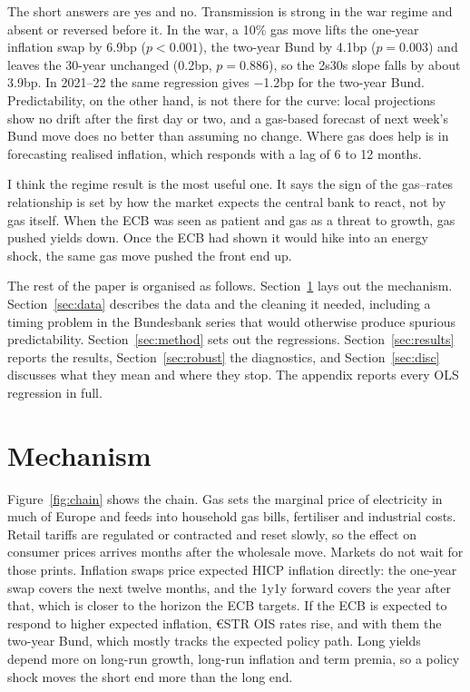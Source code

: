 \documentclass[11pt,a4paper]{article}
\begin{document}
The short answers are yes and no. Transmission is strong in the war regime and absent or reversed before it. In the
war, a 10\% gas move lifts the one-year inflation swap by 6.9bp ($p<0.001$), the two-year Bund by
4.1bp ($p=0.003$) and leaves the 30-year unchanged (0.2bp, $p=0.886$), so the 2s30s slope falls by
about 3.9bp. In 2021--22 the same regression gives $-$1.2bp for the two-year Bund. Predictability, on the other
hand, is not there for the curve: local projections show no drift after the first day or two, and a gas-based
forecast of next week's Bund move does no better than assuming no change. Where gas does help is in forecasting
realised inflation, which responds with a lag of 6 to 12 months.

I think the regime result is the most useful one. It says the sign of the gas--rates relationship is set by how the
market expects the central bank to react, not by gas itself. When the ECB was seen as patient and gas as a threat to
growth, gas pushed yields down. Once the ECB had shown it would hike into an energy shock, the same gas move pushed
the front end up.

The rest of the paper is organised as follows. Section~\ref{sec:mech} lays out the mechanism. Section~\ref{sec:data}
describes the data and the cleaning it needed, including a timing problem in the Bundesbank series that would
otherwise produce spurious predictability. Section~\ref{sec:method} sets out the regressions. Section~\ref{sec:results}
reports the results, Section~\ref{sec:robust} the diagnostics, and Section~\ref{sec:disc} discusses what they mean
and where they stop. The appendix reports every OLS regression in full.

\section{Mechanism}\label{sec:mech}

Figure~\ref{fig:chain} shows the chain. Gas sets the marginal price of electricity in much of Europe and feeds into
household gas bills, fertiliser and industrial costs. Retail tariffs are regulated or contracted and reset slowly,
so the effect on consumer prices arrives months after the wholesale move. Markets do not wait for those prints.
Inflation swaps price expected HICP inflation directly: the one-year swap covers the next twelve months, and the 1y1y
forward covers the year after that, which is closer to the horizon the ECB targets. If the ECB is expected to respond
to higher expected inflation, \euro{}STR OIS rates rise, and with them the two-year Bund, which mostly tracks the
expected policy path. Long yields depend more on long-run growth, long-run inflation and term premia, so a policy shock
moves the short end more than the long end.
\end{document}
